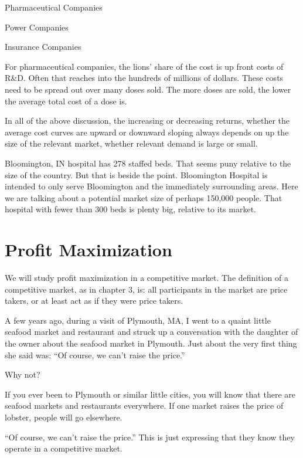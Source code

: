 \documentclass[
]{book}
\begin{document}
\begin{center}
Pharmaceutical Companies

Power Companies

Insurance Companies

\end{center}

For pharmaceutical companies, the lions' share of the cost is up front costs of R\&D. Often that reaches into the hundreds of millions of dollars. These costs need to be spread out over many doses sold. The more doses are sold, the lower the average total cost of a dose is.

In all of the above discussion, the increasing or decreasing returns, whether the average cost curves are upward or downward sloping always depends on up the size of the relevant market, whether relevant demand is large or small.

Bloomington, IN hospital has 278 staffed beds. That seems puny relative to the size of the country. But that is beside the point. Bloomington Hospital is intended to only serve Bloomington and the immediately surrounding areas. Here we are talking about a potential market size of perhaps 150,000 people. That hospital with fewer than 300 beds is plenty big, relative to its market.

\hypertarget{profit-maximization}{%
\section{Profit Maximization}\label{profit-maximization}}

We will study profit maximization in a competitive market. The definition of a competitive market, as in chapter 3, is: all participants in the market are price takers, or at least act as if they were price takers.

A few years ago, during a visit of Plymouth, MA, I went to a quaint little seafood market and restaurant and struck up a conversation with the daughter of the owner about the seafood market in Plymouth. Just about the very first thing she said was: ``Of course, we can't raise the price.''

Why not?

If you ever been to Plymouth or similar little cities, you will know that there are seafood markets and restaurants everywhere. If one market raises the price of lobster, people will go elsewhere.

``Of course, we can't raise the price.'' This is just expressing that they know they operate in a competitive market.
\end{document}
